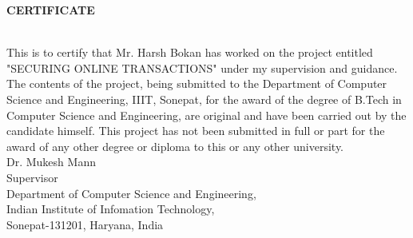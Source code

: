 \documentclass[12pt, oneside, a4paper]{article}
\begin{document}
\begin{center}
    \begin{Large}\textbf{CERTIFICATE}\end{Large}
\end{center}\\
\vspace{1cm}
This is to certify that Mr. Harsh Bokan has worked on the project entitled "SECURING ONLINE TRANSACTIONS" under my supervision and guidance.
\vspace{0.5cm}\\
The contents of the project, being submitted to the Department of Computer Science and Engineering, IIIT, Sonepat, for the award of the degree of B.Tech in Computer Science and Engineering, are original and have been carried out by the candidate himself. This project has not been submitted in full or part for the award of any other degree or diploma to this or any other university.
\vspace{4cm}\\
Dr. Mukesh Mann\\
Supervisor
\vspace{5cm}\\
Department of Computer Science and Engineering,\\
Indian Institute of Infomation Technology,\\
Sonepat-131201, Haryana, India
\pagebreak
\end{document}
